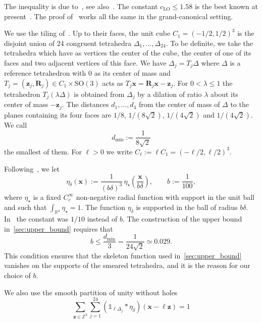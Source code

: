 \documentclass[final,reqno]{amsart}
\theoremstyle{remark}
\renewcommand{\le}{\leqslant}
\newcommand{\RR}{\mathbb{R}}
\newcommand{\ZZ}{\mathbb{Z}}
\newcommand{\SO}{\mathrm{SO}}
\newcommand{\LO}{\mathrm{LO}}
\newcommand{\iden}{\mathbb{1}}
\newcommand{\tetra}{\mathbb{\Delta}}
\begin{document}
The inequality is due to~\cite{lieb1979lower,lieb1981improved}, see also~\cite{lieb2010stability}. The constant $c_\LO\le1.58$ is the best known at present~\cite{lewin2022improved}. The proof of~\cite{lewin2022improved} works all the same in the grand-canonical setting.

We use the tiling of~\cite[Section 4.1]{lewin2020local}. Up to their faces, the unit cube $C_1=(-1/2,1/2)^3$ is the disjoint union of 24 congruent tetrahedra $\tetra_1,\ldots,\tetra_{24}$. To be definite, we take the tetrahedra which have as vertices the center of the cube, the center of one of its faces and two adjacent vertices of this face. We have $\tetra_j=T_j\tetra$ where $\tetra$ is a reference tetrahedron with $0$ as its center of mass and $T_j=(\mathbf{z}_j,\mathbf{R}_j)\in C_1\times \SO(3)$ acts as $T_j \mathbf{x}=\mathbf{R}_j\mathbf{x}-\mathbf{z}_j$. For $0<\lambda\le1$ the tetrahedron $T_j(\lambda\tetra)$ is obtained from $\tetra_j$ by a dilation of ratio $\lambda$ about its center of mass $-\mathbf{z}_j$. The distances $d_1,\ldots,d_4$ from the center of mass of $\tetra$ to the planes containing its four faces are $1/8$, $1/(8\sqrt2)$, $1/(4\sqrt2)$ and $1/(4\sqrt2)$. We call
$$
d_{\min}:=\frac{1}{8\sqrt2}
$$
the smallest of them. For $\ell>0$ we write $C_\ell:=\ell C_1=(-\ell/2,\ell/2)^3$.

Following~\cite{csirik2026non}, we let
\begin{equation}\label{eq:def_eta_delta}
\eta_\delta(\mathbf{x}):=\frac{1}{(b\delta)^{3}}\,\eta_\star\left(\frac{\mathbf{x}}{b\delta}\right),\qquad b:=\frac1{100},
\end{equation}
where $\eta_\star$ is a fixed $C^\infty_c$ non-negative radial function with support in the unit ball and such that $\int_{\RR^3}\eta_\star=1$. The function $\eta_\delta$ is supported in the ball of radius $b\delta$. In~\cite{lewin2020local} the constant was $1/10$ instead of $b$. The construction of the upper bound in~\cref{sec:upper_bound} requires that
\begin{equation}\label{eq:condition_b}
b\le\frac{d_{\min}}3=\frac{1}{24\sqrt2}\simeq0.029.
\end{equation}
This condition ensures that the skeleton function used in~\cref{sec:upper_bound} vanishes on the supports of the smeared tetrahedra, and it is the reason for our choice of $b$.

We also use the smooth partition of unity without holes
\begin{equation}\label{eq:def_xi_ell_tiling}
 \boxed{\sum_{\mathbf{z}\in\ZZ^3}\sum_{j=1}^{24} (\iden_{\ell\tetra_j}\ast\eta_\delta)(\mathbf{x}-\ell \mathbf{z})=1}
\end{equation}
\end{document}
